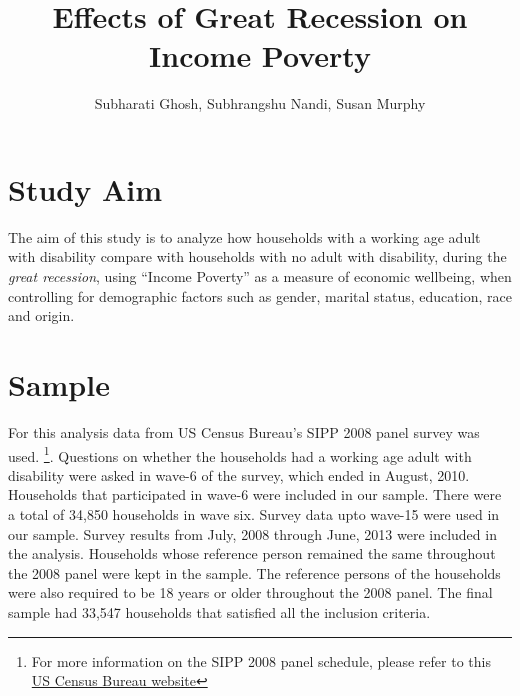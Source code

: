 \documentclass[11pt]{extarticle} %
\begin{document}
\doublespacing

\title{Effects of Great Recession on Income Poverty}
\author{Subharati Ghosh, Subhrangshu Nandi, Susan Murphy \\
\date{}
}

\maketitle

\section{Study Aim}
The aim of this study is to analyze how households with a working age adult with disability compare with households with no adult with disability, during the {\emph{great recession}}, using ``Income Poverty'' as a measure of economic wellbeing, when controlling for demographic factors such as gender, marital status, education, race and origin. 

\section{Sample}
For this analysis data from US Census Bureau's SIPP 2008 panel survey was used. {\footnote{For more information on the SIPP 2008 panel schedule, please refer to this \href{http://www.census.gov/programs-surveys/sipp/data/2008-panel.html}{US Census Bureau website}}}. Questions on whether the households had a working age adult with disability were asked in wave-6 of the survey, which ended in August, 2010. Households that participated in wave-6 were included in our sample. There were a total of 34,850 households in wave six. Survey data upto wave-15 were used in our sample. Survey results from July, 2008 through June, 2013 were included in the analysis. Households whose reference person remained the same throughout the 2008 panel were kept in the sample. The reference persons of the households were also required to be 18 years or older throughout the 2008 panel. The final sample had 33,547 households that satisfied all the inclusion criteria. 
\end{document}
